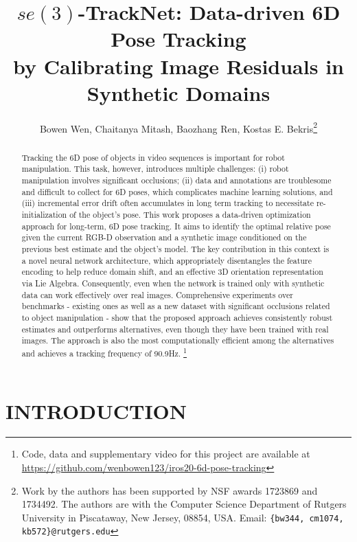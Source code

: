 \documentclass[letterpaper, 10 pt, conference]{ieeeconf}
\title{\LARGE \bf $se(3)$-TrackNet: Data-driven 6D Pose Tracking\\
by Calibrating Image Residuals in Synthetic Domains}
\author{Bowen Wen, Chaitanya Mitash, Baozhang Ren, Kostas E. Bekris\thanks{Work by the authors has been supported by NSF awards 1723869 and 1734492. The authors are with the Computer Science Department of Rutgers University in Piscataway, New Jersey, 08854, USA. Email: {\tt\small \{bw344, cm1074, kb572\}@rutgers.edu}}}
\begin{document}


\maketitle
\thispagestyle{empty}
\pagestyle{empty}


\begin{abstract}
Tracking the 6D pose of objects in video sequences is important for  robot manipulation. This  task, however, introduces multiple challenges: (i) robot manipulation involves significant occlusions; (ii) data and annotations are troublesome and difficult to collect for 6D poses, which complicates machine learning solutions, and (iii) incremental error drift often accumulates in long term tracking to necessitate re-initialization of the object's pose. This work proposes a data-driven optimization approach for long-term, 6D pose tracking. It aims to identify the optimal relative pose given the current RGB-D observation and a synthetic image conditioned on the previous best estimate and the object's model. The key contribution in this context is a novel neural network architecture, which appropriately disentangles the feature encoding to help reduce domain shift, and an effective 3D orientation representation via Lie Algebra. Consequently, even when the network is trained only with synthetic data can work effectively over real images. Comprehensive experiments over benchmarks - existing ones as well as a new dataset with significant occlusions related to object manipulation - show that the proposed approach achieves consistently robust estimates and outperforms alternatives, even though they have been trained with real images. The approach is also the most computationally efficient among the alternatives and achieves a tracking frequency of 90.9Hz. \footnote{Code, data and supplementary video for this project are available at \href{https://github.com/wenbowen123/iros20-6d-pose-tracking}{https://github.com/wenbowen123/iros20-6d-pose-tracking}} \end{abstract}


\section{INTRODUCTION}
\end{document}

